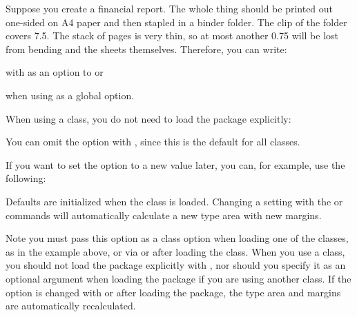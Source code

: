 \begin{Example}
  Suppose you create a financial report. The whole thing should be printed out
  one-sided on A4 paper and then stapled in a binder folder. The clip of the
  folder covers 7.5. The stack of pages is very thin, so at most
  another 0.75 will be lost from bending and the sheets themselves.
  Therefore, you can write:
  with  as an option to  or
  when using  as a global option.

  When using a {\KOMAScript} class, you do not need to load the
   package explicitly:
  You can omit the  option  with , since this
  is the default for all {\KOMAScript} classes.

  If you want to set the option to a new value later, you can, for example,
  use the following:
  Defaults are initialized when the  class is loaded.
  Changing a setting with the  or
   commands will automatically calculate a
  new type area with new margins.
\end{Example}

Note you must pass this option as a class option when
loading one of the {\KOMAScript} classes, as in the example above, or via
 or 
after loading the class. When you use a {\KOMAScript} class, you should not
load the  package explicitly with
, nor should you specify it as an optional
argument when loading the package if you are using another class. If the
option is changed with  or
 after loading the package, the type area
and margins are automatically recalculated.%
%
\EndIndexGroup


